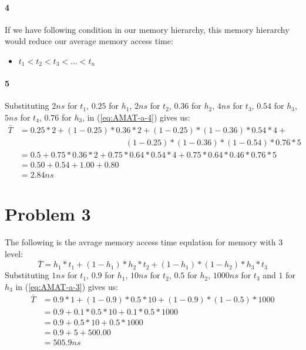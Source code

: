 \documentclass[11pt]{article}
\begin{document}
\paragraph{4}
If we have following condition in our memory hierarchy, this memory hierarchy would reduce
our average memory access time:
\begin{itemize}
\item
	$t_1 < t_2 < t_3 < \ldots < t_n$
\end{itemize}
\paragraph{5}
Substituting $2ns$ for $t_1$, $0.25$ for $h_1$, $2ns$ for $t_2$, $0.36$ for $h_2$, $4ns$ for $t_3$, $0.54$ for $h_3$,$5ns$ for $t_4$, $0.76$ for $h_3$,
in (\ref{eq:AMAT-a-4}) gives us:
\begin{align*}
	\bar{T} &= 0.25 * 2 + (1 - 0.25) * 0.36 * 2 + (1 - 0.25) * (1 - 0.36) * 0.54 * 4 + \\
	&\qquad \phantom{= 0.25 * 2 + (1 - 0.25)} (1 - 0.25) * (1 - 0.36) * (1 - 0.54) * 0.76 * 5 \\
	&= 0.5 + 0.75 * 0.36 * 2 + 0.75 * 0.64 * 0.54 * 4 + 0.75 * 0.64 * 0.46 * 0.76 * 5 \\
	&= 0.50 + 0.54 + 1.00 + 0.80 \\
	&= 2.84ns
\end{align*}
\section{Problem 3}
The following is the avrage memory access time equlation for
memory with 3 level:
\begin{equation}
	\label{eq:AMAT-a-3}
	\bar{T} = h_1 * t_1 + (1 - h_1) * h_2 * t_2 + (1 - h_1) * (1 - h_2) * h_3 * t_3
\end{equation}
Substituting $1ns$ for $t_1$, $0.9$ for $h_1$, $10ns$ for $t_2$, $0.5$ for $h_2$, $1000ns$ for $t_3$ and $1$ for $h_3$
in (\ref{eq:AMAT-a-3}) gives us:
\begin{align*}
	\bar{T} &= 0.9 * 1 + (1 - 0.9) * 0.5 * 10 + (1 - 0.9) * (1 - 0.5) * 1000\\
	&= 0.9 + 0.1 * 0.5 * 10 + 0.1 * 0.5 * 1000\\
	&= 0.9 + 0.5 * 10 + 0.5 * 1000\\
	&= 0.9 + 5 + 500.00\\
	&= 505.9ns
\end{align*}
\end{document}
